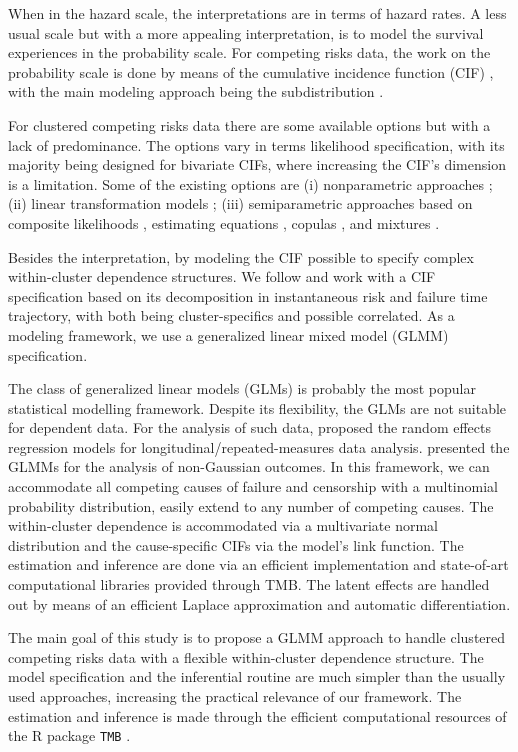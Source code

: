 \documentclass[a4paper,12pt]{article}
\begin{document}
When in the hazard scale, the interpretations are in terms of hazard
rates. A less usual scale but with a more appealing interpretation, is
to model the survival experiences in the probability scale. For
competing risks data, the work on the probability scale is done by means
of the cumulative incidence function (CIF) \citep{andersen12}, with the
main modeling approach being the subdistribution \citep{fine&gray}.

For clustered competing risks data there are some available options but
with a lack of predominance. The options vary in terms likelihood
specification, with its majority being designed for bivariate CIFs,
where increasing the CIF's dimension is a limitation. Some of the
existing options are (i) nonparametric approaches
\citep{cheng07,cheng09}; (ii) linear transformation models
\citep{fine99,gerds12}; (iii) semiparametric approaches based on
composite likelihoods \citep{shih,SCHEIKE}, estimating equations
\citep{crossoddsratioSCHEIKE,cheng&fine}, copulas
\citep{semiparametricSCHEIKE}, and mixtures \citep{naskar05,shi13}.

Besides the interpretation, by modeling the CIF possible to specify
complex within-cluster dependence structures. We follow \cite{SCHEIKE}
and work with a CIF specification based on its decomposition in
instantaneous risk and failure time trajectory, with both being
cluster-specifics and possible correlated. As a modeling framework, we
use a generalized linear mixed model (GLMM) specification.

The class of generalized linear models (GLMs) \citep{GLM72} is probably
the most popular statistical modelling framework. Despite its
flexibility, the GLMs are not suitable for dependent data. For the
analysis of such data, \cite{laird82} proposed the random effects
regression models for longitudinal/repeated-measures data
analysis. \cite{breslow93} presented the GLMMs for the analysis of
non-Gaussian outcomes. In this framework, we can accommodate all
competing causes of failure and censorship with a multinomial
probability distribution, easily extend to any number of competing
causes. The within-cluster dependence is accommodated via a multivariate
normal distribution and the cause-specific CIFs via the model's link
function. The estimation and inference are done via an efficient
implementation and state-of-art computational libraries provided through
TMB. The latent effects are handled out by means of an efficient Laplace
approximation and automatic differentiation.

The main goal of this study is to propose a GLMM approach to handle
clustered competing risks data with a flexible within-cluster dependence
structure. The model specification and the inferential routine are much
simpler than the usually used approaches, increasing the practical
relevance of our framework. The estimation and inference is made through
the efficient computational resources of the R \citep{R21} package
\texttt{TMB} \citep{TMb}.
\end{document}
